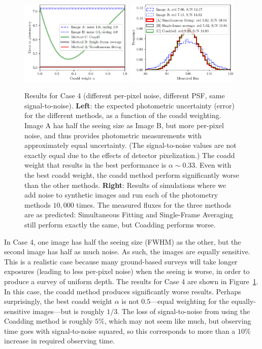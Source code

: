\documentclass[a4paper,11pt]{article}
\begin{document}
\begin{figure}[b!]
  \begin{center}
    \includegraphics[width=0.48\textwidth]{coadd-06}
    \includegraphics[width=0.48\textwidth]{coadd-07}
  \end{center}
  \caption{Results for Case 4 (different per-pixel noise, different
    PSF, same signal-to-noise).  \textbf{Left}: the expected
    photometric uncertainty (error) for the different methods, as a
    function of the coadd weighting.  Image A has half the seeing size
    as Image B, but more per-pixel noise, and thus provides
    photometric measurements with approximately equal uncertainty.
    (The signal-to-noise values are not exactly equal due to the
    effects of detector pixelization.)  The coadd weight that results
    in the best performance is $\alpha \sim 0.33$.  Even with the best
    coadd weight, the coadd method perform significantly worse than the
    other methods.
    \newline \textbf{Right}: Results of simulations where we add noise
    to synthetic images and run each of the photometry methods
    $10,000$ times.  The measured fluxes for the three methods are as
    predicted: Simultaneous Fitting and Single-Frame Averaging
    still perform exactly the same, but Coadding performs worse.
    \label{fig:casefour}}
\end{figure}

In Case 4, one image has half the seeing size (FWHM) as the other, but
the second image has half as much noise.  As such, the images are
equally sensitive.  This is a realistic case because many ground-based
surveys will take longer exposures (leading to less per-pixel noise)
when the seeing is worse, in order to produce a survey of uniform
depth.  The results for Case 4 are shown in Figure~\ref{fig:casefour}.
In this case, the coadd method produces significantly worse results.
Perhaps surprisingly, the best coadd weight $\alpha$ is not
$0.5$---equal weighting for the equally-sensitive images---but is
roughly $1/3$.  The loss of signal-to-noise from using the Coadding
method is roughly $5\%$, which may not seem like much, but observing
time goes with signal-to-noise squared, so this corresponds to more
than a $10\%$ increase in required observing time.
\end{document}
